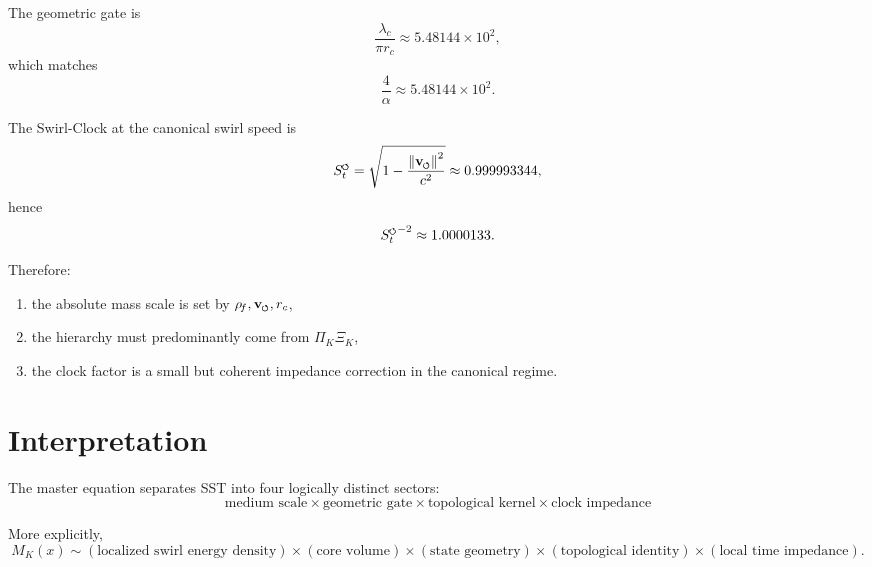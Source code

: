 \documentclass[11pt,a4paper]{article}
\newcommand{\swirlarrow}{\mathchoice{\mkern-2mu\scriptstyle\boldsymbol{\circlearrowleft}}{\mkern-2mu\scriptstyle\boldsymbol{\circlearrowleft}}{\mkern-2mu\scriptscriptstyle\boldsymbol{\circlearrowleft}}{\mkern-2mu\scriptscriptstyle\boldsymbol{\circlearrowleft}}}
\newcommand{\vswirl}{{\mathbf{v}_{\swirlarrow}}}
\newcommand{\SwirlClock}{{S_t^{\swirlarrow}}}
\newcommand{\rhoF}{\rho_{\!f}}
\providecommand{\rc}{r_c}
\begin{document}
            The geometric gate is
            \begin{equation}
                \frac{\lambda_c}{\pi \rc}\approx 5.48144\times 10^2,
            \end{equation}
            which matches
            \begin{equation}
                \frac{4}{\alpha}\approx 5.48144\times 10^2.
            \end{equation}
            
            The Swirl-Clock at the canonical swirl speed is
            \begin{equation}
                \SwirlClock=\sqrt{1-\frac{\norm{\vswirl}^2}{c^2}}
                \approx 0.999993344,
            \end{equation}
            hence
            \begin{equation}
                \SwirlClock^{-2}\approx 1.0000133.
            \end{equation}
            
            Therefore:
            \begin{enumerate}[leftmargin=1.5em]
\item the absolute mass scale is set by \(\rhoF,\vswirl,\rc\),
\item the hierarchy must predominantly come from \(\Pi_K\Xi_K\),
\item the clock factor is a small but coherent impedance correction in the canonical regime.
            \end{enumerate}
        
        \section{Interpretation}
            
            The master equation separates SST into four logically distinct sectors:
            \begin{equation}
                \boxed{
                    \text{medium scale}
                    \times
                    \text{geometric gate}
                    \times
                    \text{topological kernel}
                    \times
                    \text{clock impedance}
                }
            \end{equation}
            
            More explicitly,
            \begin{equation}
                M_K(x)
                \sim
                (\text{localized swirl energy density})
                \times
                (\text{core volume})
                \times
                (\text{state geometry})
                \times
                (\text{topological identity})
                \times
                (\text{local time impedance}).
            \end{equation}
        
\end{document}
